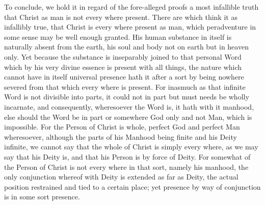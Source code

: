 To conclude, we hold it in regard of the fore-alleged proofs a most infallible truth that Christ as man is not every where present. There are which think it as infallibly true, that Christ is every where present as man, which peradventure in some sense may be well enough granted. His human substance in itself is naturally absent from the earth, his soul and body not on earth but in heaven only. Yet because the substance is inseparably joined to that personal Word which by his very divine essence is present with all things, the nature which cannot have in itself universal presence hath it after a  sort by being nowhere severed from that which every where is present. For inasmuch as that infinite Word is not divisible into parts, it could not in part but must needs be wholly incarnate, and consequently, wheresoever the Word is, it hath with it manhood, else should the Word be in part or somewhere God only and not Man, which is impossible. For the Person of Christ is whole, perfect God and perfect Man wheresoever, although the parts of his Manhood being finite and his Deity infinite, we cannot say that the whole of Christ is simply every where, as we may say that his Deity is, and that his Person is by force of Deity. For somewhat of the Person of Christ is not every where in that sort, namely his manhood, the only conjunction whereof with Deity is extended as far as Deity, the actual position restrained and tied to a certain place; yet presence by way of conjunction is in some sort presence.
